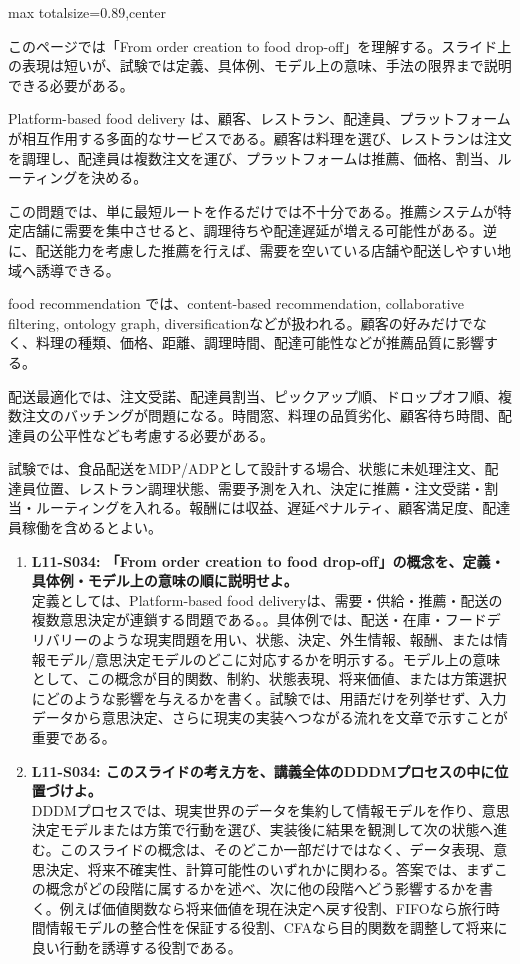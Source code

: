 \begin{minipage}[t]{0.58\textwidth}
\begin{adjustbox}{max totalsize={\textwidth}{0.89\textheight},center}
\begin{minipage}{\textwidth}\scriptsize
{}このページでは「From order creation to food drop-off」を理解する。スライド上の表現は短いが、試験では定義、具体例、モデル上の意味、手法の限界まで説明できる必要がある。\par
Platform-based food delivery は、顧客、レストラン、配達員、プラットフォームが相互作用する多面的なサービスである。顧客は料理を選び、レストランは注文を調理し、配達員は複数注文を運び、プラットフォームは推薦、価格、割当、ルーティングを決める。\par
この問題では、単に最短ルートを作るだけでは不十分である。推薦システムが特定店舗に需要を集中させると、調理待ちや配達遅延が増える可能性がある。逆に、配送能力を考慮した推薦を行えば、需要を空いている店舗や配送しやすい地域へ誘導できる。\par
food recommendation では、content-based recommendation, collaborative filtering, ontology graph, diversificationなどが扱われる。顧客の好みだけでなく、料理の種類、価格、距離、調理時間、配達可能性などが推薦品質に影響する。\par
配送最適化では、注文受諾、配達員割当、ピックアップ順、ドロップオフ順、複数注文のバッチングが問題になる。時間窓、料理の品質劣化、顧客待ち時間、配達員の公平性なども考慮する必要がある。\par
試験では、食品配送をMDP/ADPとして設計する場合、状態に未処理注文、配達員位置、レストラン調理状態、需要予測を入れ、決定に推薦・注文受諾・割当・ルーティングを入れる。報酬には収益、遅延ペナルティ、顧客満足度、配達員稼働を含めるとよい。\par{}\begin{enumerate}\item \textbf{L11-S034: 「From order creation to food drop-off」の概念を、定義・具体例・モデル上の意味の順に説明せよ。}\\定義としては、Platform-based food deliveryは、需要・供給・推薦・配送の複数意思決定が連鎖する問題である。。具体例では、配送・在庫・フードデリバリーのような現実問題を用い、状態、決定、外生情報、報酬、または情報モデル/意思決定モデルのどこに対応するかを明示する。モデル上の意味として、この概念が目的関数、制約、状態表現、将来価値、または方策選択にどのような影響を与えるかを書く。試験では、用語だけを列挙せず、入力データから意思決定、さらに現実の実装へつながる流れを文章で示すことが重要である。\item \textbf{L11-S034: このスライドの考え方を、講義全体のDDDMプロセスの中に位置づけよ。}\\DDDMプロセスでは、現実世界のデータを集約して情報モデルを作り、意思決定モデルまたは方策で行動を選び、実装後に結果を観測して次の状態へ進む。このスライドの概念は、そのどこか一部だけではなく、データ表現、意思決定、将来不確実性、計算可能性のいずれかに関わる。答案では、まずこの概念がどの段階に属するかを述べ、次に他の段階へどう影響するかを書く。例えば価値関数なら将来価値を現在決定へ戻す役割、FIFOなら旅行時間情報モデルの整合性を保証する役割、CFAなら目的関数を調整して将来に良い行動を誘導する役割である。\end{enumerate}

\end{minipage}
\end{adjustbox}
\end{minipage}
